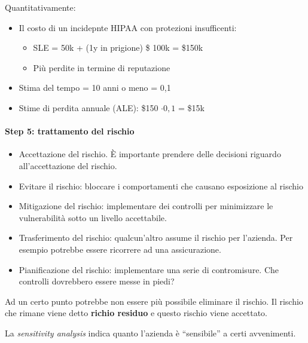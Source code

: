 

Quantitativamente:
\begin{itemize}
\item Il costo di un incidepnte HIPAA con protezioni insufficenti:
\begin{itemize}
 \item SLE = 50k + (1y in prigione) \$ 100k = \$150k
 \item Più perdite in termine di reputazione
\end{itemize}
\item Stima del tempo = 10 anni o meno = 0,1
\item Stime di perdita annuale (ALE): \$150 $\cdot 0,1$ = \$15k
\end{itemize}


\paragraph*{Step 5: trattamento del rischio}



\begin{itemize}
\item Accettazione del rischio. È importante prendere delle decisioni riguardo 
all'accettazione del rischio.
\item Evitare il rischio: bloccare i comportamenti che causano esposizione al 
rischio
\item Mitigazione del rischio: implementare dei controlli per minimizzare le 
vulnerabilità sotto un livello accettabile.
\item Trasferimento del rischio: qualcun'altro assume il rischio per l'azienda. 
Per esempio potrebbe essere ricorrere ad una assicurazione.
\item Pianificazione del rischio: implementare una serie di contromisure. Che 
controlli dovrebbero essere messe in piedi?
\end{itemize}

Ad un certo punto potrebbe non essere più possibile eliminare il rischio. Il 
rischio che rimane viene detto \textbf{richio residuo} e questo rischio viene 
accettato.

La \textit{sensitivity analysis} indica quanto l'azienda è ``sensibile'' a certi 
avvenimenti.

